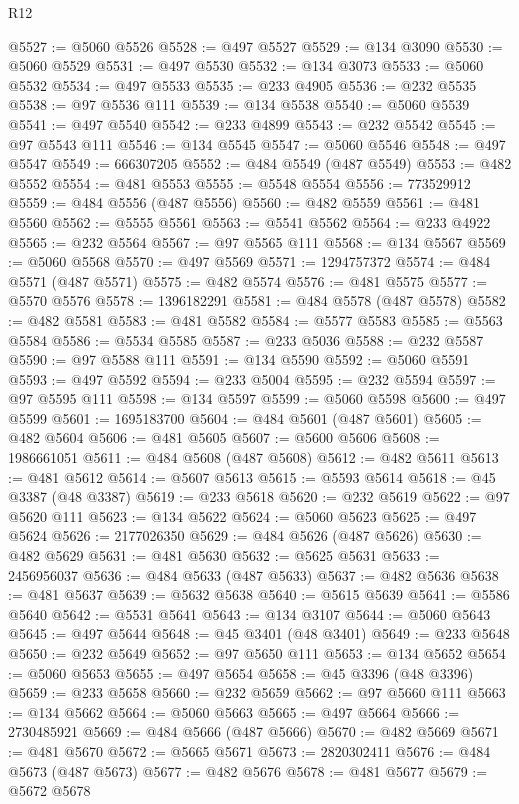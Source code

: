 \begin{lexlean}{R12}
\begin{coremodule}
@5527 := @5060 @5526
@5528 := @497 @5527
@5529 := @134 @3090
@5530 := @5060 @5529
@5531 := @497 @5530
@5532 := @134 @3073
@5533 := @5060 @5532
@5534 := @497 @5533
@5535 := @233 @4905
@5536 := @232 @5535
@5538 := @97 @5536 @111
@5539 := @134 @5538
@5540 := @5060 @5539
@5541 := @497 @5540
@5542 := @233 @4899
@5543 := @232 @5542
@5545 := @97 @5543 @111
@5546 := @134 @5545
@5547 := @5060 @5546
@5548 := @497 @5547
@5549 := 666307205
@5552 := @484 @5549 (@487 @5549)
@5553 := @482 @5552
@5554 := @481 @5553
@5555 := @5548 @5554
@5556 := 773529912
@5559 := @484 @5556 (@487 @5556)
@5560 := @482 @5559
@5561 := @481 @5560
@5562 := @5555 @5561
@5563 := @5541 @5562
@5564 := @233 @4922
@5565 := @232 @5564
@5567 := @97 @5565 @111
@5568 := @134 @5567
@5569 := @5060 @5568
@5570 := @497 @5569
@5571 := 1294757372
@5574 := @484 @5571 (@487 @5571)
@5575 := @482 @5574
@5576 := @481 @5575
@5577 := @5570 @5576
@5578 := 1396182291
@5581 := @484 @5578 (@487 @5578)
@5582 := @482 @5581
@5583 := @481 @5582
@5584 := @5577 @5583
@5585 := @5563 @5584
@5586 := @5534 @5585
@5587 := @233 @5036
@5588 := @232 @5587
@5590 := @97 @5588 @111
@5591 := @134 @5590
@5592 := @5060 @5591
@5593 := @497 @5592
@5594 := @233 @5004
@5595 := @232 @5594
@5597 := @97 @5595 @111
@5598 := @134 @5597
@5599 := @5060 @5598
@5600 := @497 @5599
@5601 := 1695183700
@5604 := @484 @5601 (@487 @5601)
@5605 := @482 @5604
@5606 := @481 @5605
@5607 := @5600 @5606
@5608 := 1986661051
@5611 := @484 @5608 (@487 @5608)
@5612 := @482 @5611
@5613 := @481 @5612
@5614 := @5607 @5613
@5615 := @5593 @5614
@5618 := @45 @3387 (@48 @3387)
@5619 := @233 @5618
@5620 := @232 @5619
@5622 := @97 @5620 @111
@5623 := @134 @5622
@5624 := @5060 @5623
@5625 := @497 @5624
@5626 := 2177026350
@5629 := @484 @5626 (@487 @5626)
@5630 := @482 @5629
@5631 := @481 @5630
@5632 := @5625 @5631
@5633 := 2456956037
@5636 := @484 @5633 (@487 @5633)
@5637 := @482 @5636
@5638 := @481 @5637
@5639 := @5632 @5638
@5640 := @5615 @5639
@5641 := @5586 @5640
@5642 := @5531 @5641
@5643 := @134 @3107
@5644 := @5060 @5643
@5645 := @497 @5644
@5648 := @45 @3401 (@48 @3401)
@5649 := @233 @5648
@5650 := @232 @5649
@5652 := @97 @5650 @111
@5653 := @134 @5652
@5654 := @5060 @5653
@5655 := @497 @5654
@5658 := @45 @3396 (@48 @3396)
@5659 := @233 @5658
@5660 := @232 @5659
@5662 := @97 @5660 @111
@5663 := @134 @5662
@5664 := @5060 @5663
@5665 := @497 @5664
@5666 := 2730485921
@5669 := @484 @5666 (@487 @5666)
@5670 := @482 @5669
@5671 := @481 @5670
@5672 := @5665 @5671
@5673 := 2820302411
@5676 := @484 @5673 (@487 @5673)
@5677 := @482 @5676
@5678 := @481 @5677
@5679 := @5672 @5678

\end{coremodule}
\end{lexlean}
